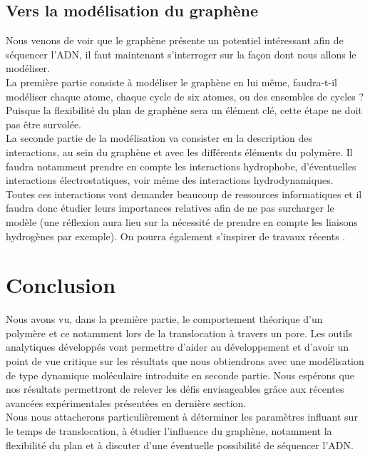 \documentclass[a4paper,11pt]{article}
\begin{document}
\subsection{Vers la modélisation du graphène}

Nous venons de voir que le graphène présente un potentiel intéressant afin de séquencer l'ADN, il faut maintenant s'interroger sur la façon dont nous allons le modéliser.\\

La première partie consiste à modéliser le graphène en lui même, faudra-t-il modéliser chaque atome, chaque cycle de six atomes, ou des ensembles de cycles ? Puisque la flexibilité du plan de graphène sera un élément clé, cette étape ne doit pas être survolée.\\

La seconde partie de la modélisation va consister en la description des interactions, au sein du graphène et avec les différents éléments du polymère. Il faudra notamment prendre en compte les interactions hydrophobe, d'éventuelles interactions électrostatiques, voir même des interactions hydrodynamiques. Toutes ces interactions vont demander beaucoup de ressources informatiques et il faudra donc étudier leurs importances relatives afin de ne pas surcharger le modèle (une réflexion aura lieu sur la nécessité de prendre en compte les liaisons hydrogènes par exemple). On pourra également s'inspirer de travaux récents \cite{doublebrin}.

\section{Conclusion}

Nous avons vu, dans la première partie, le comportement théorique d'un polymère et ce notamment lors de la translocation à travers un pore. Les outils analytiques développés vont permettre d'aider au développement et d'avoir un point de vue critique sur les résultats que nous obtiendrons avec une modélisation de type dynamique moléculaire introduite en seconde partie. Nous espérons que nos résultats permettront de relever les défis envisageables grâce aux récentes avancées expérimentales présentées en dernière section.\\

Nous nous attacherons particulièrement à déterminer les paramètres influant sur le temps de translocation, à étudier l'influence du graphène, notamment la flexibilité du plan et à discuter d'une éventuelle possibilité de séquencer l'ADN.




\end{document}
